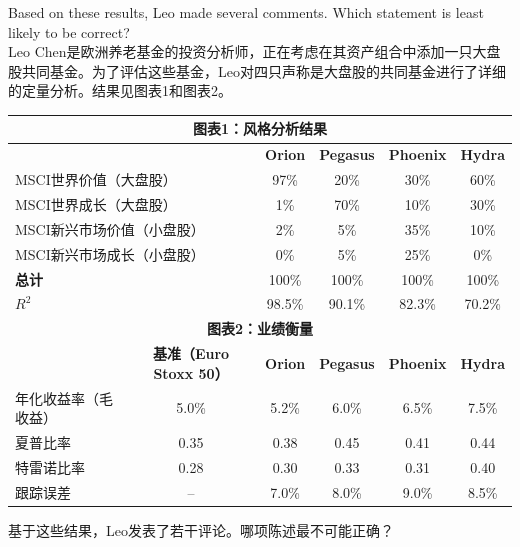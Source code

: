 \documentclass{article}
\newcounter{question} %
\begin{document}
\begin{question}
    Based on these results, Leo made several comments. Which statement is least likely to be correct?
    \\    Leo Chen是欧洲养老基金的投资分析师，正在考虑在其资产组合中添加一只大盘股共同基金。为了评估这些基金，Leo对四只声称是大盘股的共同基金进行了详细的定量分析。结果见图表1和图表2。

    \begin{table}[H]
        \centering
        \renewcommand{\arraystretch}{1.2}
        \begin{tabular}{|l|c|c|c|c|c|}
            \hline
            \multicolumn{6}{|c|}{\textbf{图表1：风格分析结果}} \\
            \hline
            \multicolumn{2}{|l|}{ } & \textbf{Orion} & \textbf{Pegasus} & \textbf{Phoenix} & \textbf{Hydra} \\
            \hline
            \multicolumn{2}{|l|}{MSCI世界价值（大盘股）} & 97\%  & 20\%  & 30\%  & 60\%  \\
            \multicolumn{2}{|l|}{MSCI世界成长（大盘股）} & 1\%   & 70\%  & 10\%  & 30\%  \\
            \multicolumn{2}{|l|}{MSCI新兴市场价值（小盘股）}   & 2\%   & 5\%   & 35\%  & 10\%  \\
            \multicolumn{2}{|l|}{MSCI新兴市场成长（小盘股）}  & 0\%   & 5\%   & 25\%  & 0\%   \\
            \multicolumn{2}{|l|}{\textbf{总计}}              & 100\% & 100\% & 100\% & 100\% \\
            \hline
            \multicolumn{2}{|l|}{$R^2$}                      & 98.5\% & 90.1\% & 82.3\% & 70.2\% \\
            \hline
            \multicolumn{6}{|c|}{\textbf{图表2：业绩衡量}} \\
            \hline
            & \textbf{基准（Euro Stoxx 50）} & \textbf{Orion} & \textbf{Pegasus} & \textbf{Phoenix} & \textbf{Hydra} \\
            \hline
            年化收益率（毛收益） & 5.0\% & 5.2\% & 6.0\% & 6.5\% & 7.5\% \\
            夏普比率          & 0.35  & 0.38 & 0.45 & 0.41 & 0.44 \\
            特雷诺比率         & 0.28  & 0.30 & 0.33 & 0.31 & 0.40 \\
            跟踪误差        & --    & 7.0\%  & 8.0\% & 9.0\% & 8.5\% \\
            \hline
        \end{tabular}
    \end{table}

    基于这些结果，Leo发表了若干评论。哪项陈述最不可能正确？
\end{question}
\end{document}
